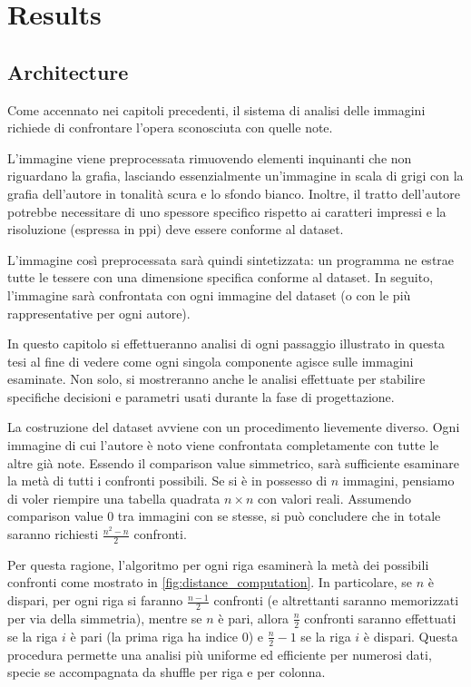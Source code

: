 \chapter{Results}
\begin{toDo}
	\section{Architecture}
	Come accennato nei capitoli precedenti, il sistema di analisi delle immagini richiede di confrontare l'opera sconosciuta con quelle note.

	\noindent L'immagine viene preprocessata rimuovendo elementi inquinanti che non riguardano la grafia, lasciando essenzialmente un'immagine in scala di grigi con la grafia dell'autore in tonalità scura e lo sfondo bianco. Inoltre, il tratto dell'autore potrebbe necessitare di uno spessore specifico rispetto ai caratteri impressi e la risoluzione (espressa in \gls{ppi}) deve essere conforme al dataset.

	\noindent L'immagine così preprocessata sarà quindi sintetizzata: un programma ne estrae tutte le tessere con una dimensione specifica conforme al dataset. In seguito, l'immagine sarà confrontata con ogni immagine del dataset (o con le più rappresentative per ogni autore).

	\noindent In questo capitolo si effettueranno analisi di ogni passaggio illustrato in questa tesi al fine di vedere come ogni singola componente agisce sulle immagini esaminate. Non solo, si mostreranno anche le analisi effettuate per stabilire specifiche decisioni e parametri usati durante la fase di progettazione.

	\bigskip\noindent La costruzione del dataset avviene con un procedimento lievemente diverso. Ogni immagine di cui l'autore è noto viene confrontata completamente con tutte le altre già note. Essendo il comparison value simmetrico, sarà sufficiente esaminare la metà di tutti i confronti possibili. Se si è in possesso di $n$ immagini, pensiamo di voler riempire una tabella quadrata $n\times n$ con valori reali. Assumendo comparison value $0$ tra immagini con se stesse, si può concludere che in totale saranno richiesti $\frac{n^2-n}{2}$ confronti.

	\noindent Per questa ragione, l'algoritmo per ogni riga esaminerà la metà dei possibili confronti come mostrato in \cref{fig:distance_computation}. In particolare, se $n$ è dispari, per ogni riga si faranno $\frac{n-1}{2}$ confronti (e altrettanti saranno memorizzati per via della simmetria), mentre se $n$ è pari, allora $\frac{n}{2}$ confronti saranno effettuati se la riga $i$ è pari (la prima riga ha indice $0$) e $\frac{n}{2}-1$ se la riga $i$ è dispari. Questa procedura permette una analisi più uniforme ed efficiente per numerosi dati, specie se accompagnata da shuffle per riga e per colonna.


\end{toDo}
